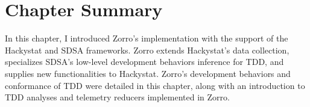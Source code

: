 \begin{comment}
The TDD telemetry reducers enable us to define telemetry streams
to monitor software project development.
\begin{figure}[htbp]
  \centering
  \texttt{[image: figs/Zorro-Analysis-TDDPercent]}
  \caption{Telemetry of TDD Percent}
  \label{fig:Zorro-Analysis-Telemetry-TDDPercent}
\end{figure}
\paragraph{Ratio of Effort on Test to Effort on Production}
\label{sec:RatioOfEffortOnTestToEffortOnProduction}

\paragraph{TDD Percentage vs. Testing Coverage}
\label{sec:TDDPercentageVsTestingCoverage}
\end{comment}

\section{Chapter Summary}
In this chapter, I introduced Zorro's implementation with the support 
of the Hackystat and SDSA frameworks. Zorro extends Hackystat's 
data collection, specializes SDSA's low-level development
behaviors inference for TDD, and supplies new functionalities to 
Hackystat. Zorro's development behaviors and conformance of TDD 
were detailed in this chapter, along with an introduction
to TDD analyses and telemetry reducers implemented in Zorro.